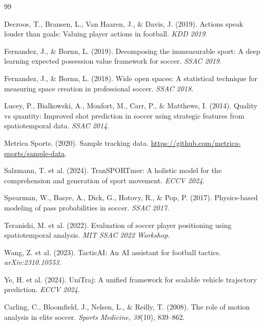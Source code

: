\documentclass[10pt,twocolumn]{article}
\begin{document}

\begin{thebibliography}{99}

Decroos, T., Bransen, L., Van Haaren, J., \& Davis, J. (2019).
Actions speak louder than goals: Valuing player actions in football.
\textit{KDD 2019}.

Fernandez, J., \& Bornn, L. (2019).
Decomposing the immeasurable sport: A deep learning expected possession value framework for soccer.
\textit{SSAC 2019}.

Fernandez, J., \& Bornn, L. (2018).
Wide open spaces: A statistical technique for measuring space creation in professional soccer.
\textit{SSAC 2018}.

Lucey, P., Bialkowski, A., Monfort, M., Carr, P., \& Matthews, I. (2014).
Quality vs quantity: Improved shot prediction in soccer using strategic features from spatiotemporal data.
\textit{SSAC 2014}.

Metrica Sports. (2020). Sample tracking data.
\url{https://github.com/metrica-sports/sample-data}.

Salzmann, T. et al. (2024).
TranSPORTmer: A holistic model for the comprehension and generation of sport movement.
\textit{ECCV 2024}.

Spearman, W., Basye, A., Dick, G., Hotovy, R., \& Pop, P. (2017).
Physics-based modeling of pass probabilities in soccer.
\textit{SSAC 2017}.

Teranishi, M. et al. (2022).
Evaluation of soccer player positioning using spatiotemporal analysis.
\textit{MIT SSAC 2022 Workshop}.

Wang, Z. et al. (2023).
TacticAI: An AI assistant for football tactics.
\textit{arXiv:2310.10553}.

Ye, H. et al. (2024).
UniTraj: A unified framework for scalable vehicle trajectory prediction.
\textit{ECCV 2024}.

Carling, C., Bloomfield, J., Nelsen, L., \& Reilly, T. (2008).
The role of motion analysis in elite soccer.
\textit{Sports Medicine, 38}(10), 839--862.

\end{thebibliography}
\end{document}
